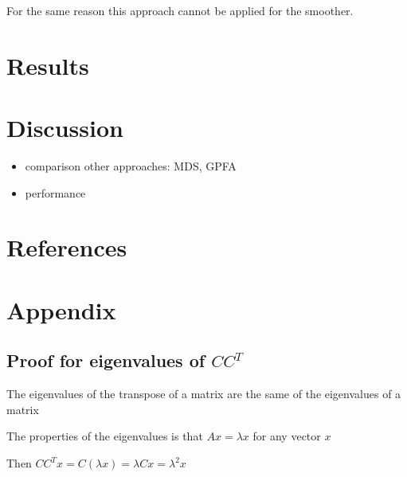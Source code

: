 \documentclass{article}
\begin{document}
For the same reason this approach cannot be applied for the smoother.

\section{Results}

\section{Discussion}

\begin{itemize}
    \item comparison other approaches: MDS, GPFA
    \item performance
\end{itemize}

\section*{References}

\printbibliography

\section*{Appendix}

\subsection{Proof for eigenvalues of $CC^T$}

The eigenvalues of the transpose of a matrix are the same of the eigenvalues of a matrix

The properties of the eigenvalues is that $Ax=\lambda x$ for any vector $x$

Then $CC^Tx=C(\lambda x) = \lambda Cx = \lambda^2 x$
\end{document}
